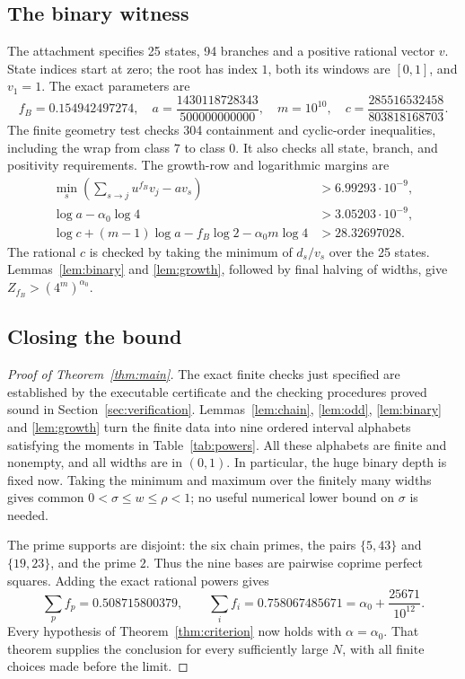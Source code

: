\documentclass[11pt]{article}
\theoremstyle{definition}
\theoremstyle{remark}
\newcommand{\al}{\alpha_0}
\begin{document}
\subsection{The binary witness}
The attachment specifies 25 states, 94 branches and a positive rational
vector $v$. State indices start at zero; the root has index $1$, both its
windows are $[0,1]$, and $v_1=1$. The exact parameters are
\[
 f_B=0.154942497274,\quad
 a=\frac{1430118728343}{500000000000},\quad m=10^{10},\quad
 c=\frac{285516532458}{803818168703}.
\]
The finite geometry test checks 304 containment and cyclic-order
inequalities, including the wrap from class $7$ to class $0$.
It also checks all state, branch, and positivity requirements.
The growth-row and logarithmic margins are
\begin{align}
 \min_s\left(\sum_{s\to j}u^{f_B}v_j-av_s\right)
       &>6.99293\cdot10^{-9},\label{eq:rowmargin}\\
 \log a-\al\log4&>3.05203\cdot10^{-9},\label{eq:growthmargin}\\
 \log c+(m-1)\log a-f_B\log2-\al m\log4
       &>28.32697028.\label{eq:depthmargin}
\end{align}
The rational $c$ is checked by taking the minimum of $d_s/v_s$ over the
25 states. Lemmas~\ref{lem:binary} and \ref{lem:growth}, followed by final
halving of widths, give $Z_{f_B}>(4^m)^{\al}$.

\subsection{Closing the bound}
\begin{proof}[Proof of Theorem~\ref{thm:main}]
The exact finite checks just specified are established by the executable
certificate and the checking procedures proved sound in
Section~\ref{sec:verification}. Lemmas~\ref{lem:chain}, \ref{lem:odd},
\ref{lem:binary} and \ref{lem:growth} turn the finite data into nine ordered
interval alphabets satisfying the moments in Table~\ref{tab:powers}.
All these alphabets are finite and nonempty, and all widths are in $(0,1)$.
In particular, the huge binary depth is fixed now. Taking the minimum and
maximum over the finitely many widths gives common
$0<\sigma\le w\le\rho<1$; no useful numerical lower bound on $\sigma$
is needed.

The prime supports are disjoint: the six chain primes, the pairs
$\{5,43\}$ and $\{19,23\}$, and the prime $2$. Thus the nine bases are
pairwise coprime perfect squares. Adding the exact rational powers gives
\[
 \sum_p f_p=0.508715800379,\qquad
 \sum_i f_i=0.758067485671=\al+\frac{25671}{10^{12}}.
\]
Every hypothesis of Theorem~\ref{thm:criterion} now holds with
$\alpha=\al$. That theorem supplies the conclusion for every sufficiently
large $N$, with all finite choices made before the limit.
\end{proof}
\end{document}
